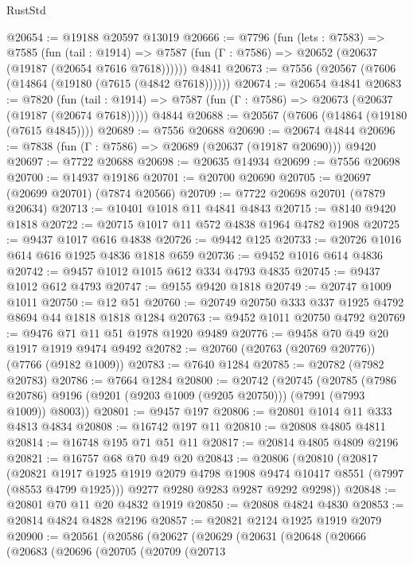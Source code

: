 \begin{lexlean}{RustStd}
\begin{coremodule}
{\begin{coremodule}
{{{{{{{{{{{{{{{{{{{{{{{{{{{{{{{{{{{{{{{{{{{@20654 := @19188 @20597 @13019
@20666 := @7796
    (fun (lets : @7583) =>
    @7585
      (fun (tail : @1914) =>
      @7587 (fun (Γ : @7586) => @20652 (@20637 (@19187 (@20654 @7616 @7618))))))
    @4841
@20673 := @7556 (@20567 (@7606 (@14864 (@19180 (@7615 (@4842 @7618))))))
@20674 := @20654 @4841
@20683 := @7820
    (fun (tail : @1914) => @7587 (fun (Γ : @7586) => @20673 (@20637 (@19187 (@20674 @7618)))))
    @4844
@20688 := @20567 (@7606 (@14864 (@19180 (@7615 @4845))))
@20689 := @7556 @20688
@20690 := @20674 @4844
@20696 := @7838 (fun (Γ : @7586) => @20689 (@20637 (@19187 @20690))) @9420
@20697 := @7722 @20688
@20698 := @20635 @14934
@20699 := @7556 @20698
@20700 := @14937 @19186
@20701 := @20700 @20690
@20705 := @20697 (@20699 @20701) (@7874 @20566)
@20709 := @7722 @20698 @20701 (@7879 @20634)
@20713 := @10401 @1018 @11 @4841 @4843
@20715 := @8140 @9420 @1818
@20722 := @20715 @1017 @11 @572 @4838 @1964 @4782 @1908
@20725 := @9437 @1017 @616 @4838
@20726 := @9442 @125
@20733 := @20726 @1016 @614 @616 @1925 @4836 @1818 @659
@20736 := @9452 @1016 @614 @4836
@20742 := @9457 @1012 @1015 @612 @334 @4793 @4835
@20745 := @9437 @1012 @612 @4793
@20747 := @9155 @9420 @1818
@20749 := @20747 @1009 @1011
@20750 := @12 @51
@20760 := @20749 @20750 @333 @337 @1925 @4792 @8694 @44 @1818 @1818 @1284
@20763 := @9452 @1011 @20750 @4792
@20769 := @9476 @71 @11 @51 @1978 @1920 @9489
@20776 := @9458 @70 @49 @20 @1917 @1919 @9474 @9492
@20782 := @20760 (@20763 (@20769 @20776)) (@7766 (@9182 @1009))
@20783 := @7640 @1284
@20785 := @20782 (@7982 @20783)
@20786 := @7664 @1284
@20800 := @20742
    (@20745
      (@20785
        (@7986 @20786)
        @9196
        (@9201 (@9203 @1009 (@9205 @20750)))
        (@7991 (@7993 @1009))
        @8003))
@20801 := @9457 @197
@20806 := @20801 @1014 @11 @333 @4813 @4834
@20808 := @16742 @197 @11
@20810 := @20808 @4805 @4811
@20814 := @16748 @195 @71 @51 @11
@20817 := @20814 @4805 @4809 @2196
@20821 := @16757 @68 @70 @49 @20
@20843 := @20806
    (@20810
      (@20817
        (@20821 @1917 @1925 @1919 @2079 @4798 @1908 @9474 @10417 @8551 (@7997 (@8553 @4799 @1925)))
        @9277
        @9280
        @9283
        @9287
        @9292
        @9298))
@20848 := @20801 @70 @11 @20 @4832 @1919
@20850 := @20808 @4824 @4830
@20853 := @20814 @4824 @4828 @2196
@20857 := @20821 @2124 @1925 @1919 @2079
@20900 := @20561
    (@20586
      (@20627
        (@20629
          (@20631
            (@20648
              (@20666
                (@20683
                  (@20696
                    (@20705
                      (@20709
                        (@20713
}}}}}}}}}}}}}}}}}}}}}}}}}}}}}}}}}}}}}}}}}}}
\end{coremodule}}
\end{coremodule}
\end{lexlean}
